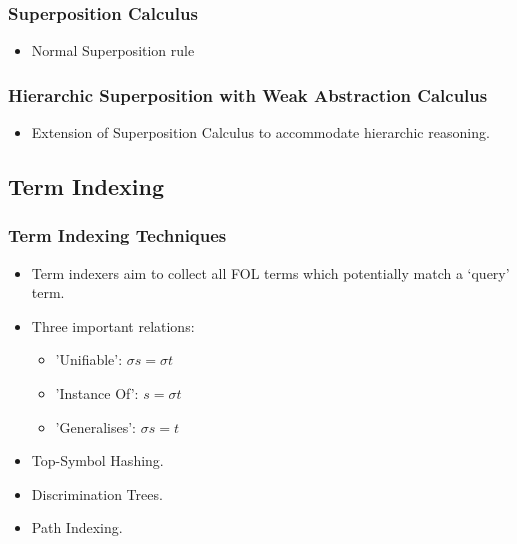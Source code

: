 \documentclass[10pt]{beamer}
\newcommand{\HSWAC}{Hierarchic Superposition with Weak Abstraction Calculus}
\begin{document}
\begin{NoHyper}
\begin{frame}
  \frametitle{Superposition Calculus}
  \begin{itemize}
  \item<1-> Normal Superposition rule
  \end{itemize}
\end{frame}

\begin{frame}
  \frametitle{\HSWAC}
  \begin{itemize}
  \item<1-> Extension of Superposition Calculus to accommodate hierarchic reasoning.
  \end{itemize}
\end{frame}

\subsection{Term Indexing} 
\begin{frame}
  \frametitle{Term Indexing Techniques}
  \begin{itemize}
  \item<1-> Term indexers aim to collect all FOL terms which potentially match a `query' term.
  \item<1-> Three important relations:
  \begin{itemize}
  \item<2-> 'Unifiable': $\sigma s = \sigma t$
  \item<2-> 'Instance Of': $s = \sigma t$
  \item<2-> 'Generalises': $\sigma s = t$
  \end{itemize}
  \item<3-> Top-Symbol Hashing.
  \item<3-> Discrimination Trees.
  \item<3-> Path Indexing.
  \end{itemize}
\end{frame}


\end{NoHyper}
\end{document}
